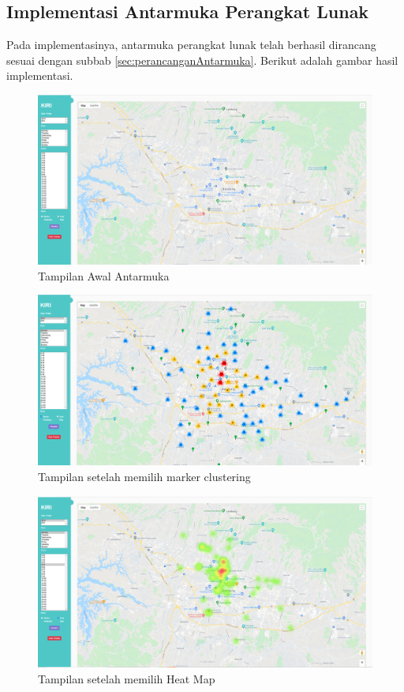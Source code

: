 \subsection{Implementasi Antarmuka Perangkat Lunak}
Pada implementasinya, antarmuka perangkat lunak telah berhasil dirancang sesuai dengan subbab \ref{sec:perancanganAntarmuka}. Berikut adalah gambar hasil implementasi.

\begin{figure}[H]
	\centering  
	\includegraphics[scale=0.3]{Gambar/Kiri_Ui.PNG}  
	\caption[Tampilan Awal Antarmuka]{Tampilan Awal Antarmuka} 
	\label{fig:interface1} 
\end{figure}

\begin{figure}[H]
	\centering  
	\includegraphics[scale=0.3]{Gambar/Kiri_Ui_Marker.PNG}  
	\caption[Tampilan setelah memilih marker clustering ]{Tampilan setelah memilih marker clustering} 
	\label{fig:interface2} 
\end{figure}

\begin{figure}[H]
	\centering  
	\includegraphics[scale=0.3]{Gambar/Kiri_Ui_Heat_Map.PNG}  
	\caption[Tampilan setelah memilih Heat Map]{Tampilan setelah memilih Heat Map} 
	\label{fig:interface3} 
\end{figure}

